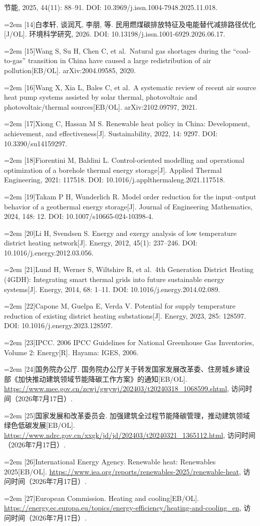 \documentclass[12pt,a4paper]{article}
\newenvironment{refsectionflush}
  {\par\sloppy\setlength{\parindent}{0pt}\setlength{\parskip}{0pt}}
  {\par\fussy}
\newcommand{\refentry}[2]{%
  \par\noindent\hangindent=2em\hangafter=1
  [#1]\enspace #2\par}
\begin{document}
\begin{refsectionflush}
{节能, 2025, 44(11): 88--91. DOI: 10.3969/j.issn.1004-7948.2025.11.018.}
\refentry{14}{白孝轩, 谈润芃, 李朋, 等.
民用燃煤碳排放特征及电能替代减排路径优化{[}J/OL{]}. 环境科学研究, 2026.
DOI: 10.13198/j.issn.1001-6929.2026.06.17.}
\refentry{15}{Wang S, Su H, Chen C, et al.~Natural gas shortages during the
``coal-to-gas'' transition in China have caused a large redistribution
of air pollution{[}EB/OL{]}. arXiv:2004.09585, 2020.}
\refentry{16}{Wang X, Xia L, Bales C, et al.~A systematic review of recent
air source heat pump systems assisted by solar thermal, photovoltaic and
photovoltaic/thermal sources{[}EB/OL{]}. arXiv:2102.09797, 2021.}
\refentry{17}{Xiong C, Hassan M S. Renewable heat policy in China:
Development, achievement, and effectiveness{[}J{]}. Sustainability,
2022, 14: 9297. DOI: 10.3390/su14159297.}
\refentry{18}{Fiorentini M, Baldini L. Control-oriented modelling and
operational optimization of a borehole thermal energy storage{[}J{]}.
Applied Thermal Engineering, 2021: 117518. DOI:
10.1016/j.applthermaleng.2021.117518.}
\refentry{19}{Takam P H, Wunderlich R. Model order reduction for the
input--output behavior of a geothermal energy storage{[}J{]}. Journal of
Engineering Mathematics, 2024, 148: 12. DOI: 10.1007/s10665-024-10398-4.}
\refentry{20}{Li H, Svendsen S. Energy and exergy analysis of low temperature
district heating network{[}J{]}. Energy, 2012, 45(1): 237--246. DOI:
10.1016/j.energy.2012.03.056.}
\refentry{21}{Lund H, Werner S, Wiltshire R, et al.~4th Generation District
Heating (4GDH): Integrating smart thermal grids into future sustainable
energy systems{[}J{]}. Energy, 2014, 68: 1--11. DOI:
10.1016/j.energy.2014.02.089.}
\refentry{22}{Capone M, Guelpa E, Verda V. Potential for supply temperature
reduction of existing district heating substations{[}J{]}. Energy, 2023,
285: 128597. DOI: 10.1016/j.energy.2023.128597.}
\refentry{23}{IPCC. 2006 IPCC Guidelines for National Greenhouse Gas
Inventories, Volume 2: Energy{[}R{]}. Hayama: IGES, 2006.}
\refentry{24}{国务院办公厅. 国务院办公厅关于转发国家发展改革委、住房城乡建设部《加快推动建筑领域节能降碳工作方案》的通知{[}EB/OL{]}. \url{https://www.mee.gov.cn/zcwj/gwywj/202403/t20240318\_1068599.shtml}, 访问时间（2026年7月17日）.}
\refentry{25}{国家发展和改革委员会. 加强建筑全过程节能降碳管理，推动建筑领域绿色低碳发展{[}EB/OL{]}. \url{https://www.ndrc.gov.cn/xxgk/jd/jd/202403/t20240321\_1365112.html}, 访问时间（2026年7月17日）.}
\refentry{26}{International Energy Agency. Renewable heat: Renewables 2025{[}EB/OL{]}. \url{https://www.iea.org/reports/renewables-2025/renewable-heat}, 访问时间（2026年7月17日）.}
\refentry{27}{European Commission. Heating and cooling{[}EB/OL{]}. \url{https://energy.ec.europa.eu/topics/energy-efficiency/heating-and-cooling\_en}, 访问时间（2026年7月17日）.}


\end{refsectionflush}
\end{document}
